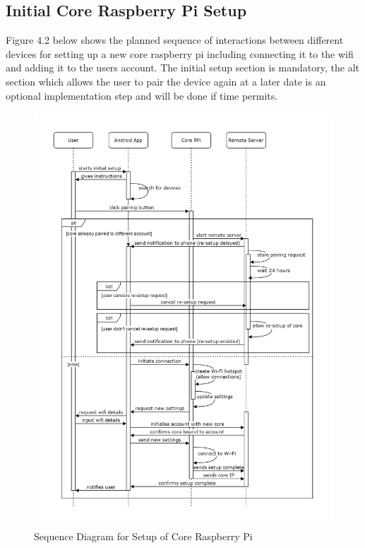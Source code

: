 \subsection{Initial Core Raspberry Pi Setup}
Figure 4.2 below shows the planned sequence of interactions between different devices for setting up a new core raspberry pi including connecting it to the wifi and adding it to the users account. The initial setup section is mandatory, the alt section which allows the user to pair the device again at a later date is an optional implementation step and will be done if time permits.
\begin{figure}[H]
	\caption{Sequence Diagram for Setup of Core Raspberry Pi}
	\centering
		\includegraphics[height=0.6\textheight,keepaspectratio]{"Graphics/Initial Core RPi Setup"}
\end{figure}

